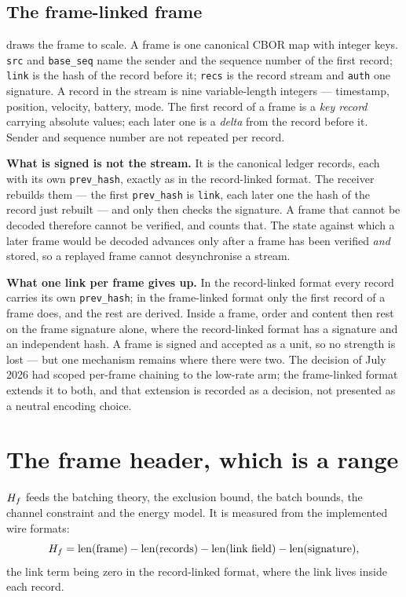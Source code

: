 \subsection{The frame-linked frame}



 draws the frame to scale. A frame is one canonical CBOR map with integer keys. \texttt{src} and \texttt{base\_seq} name the
sender and the sequence number of the first record; \texttt{link} is the hash of the record
before it; \texttt{recs} is the record stream and \texttt{auth} one signature. A record in the
stream is nine variable-length integers --- timestamp, position, velocity, battery, mode. The
first record of a frame is a \emph{key record} carrying absolute values; each later one is a
\emph{delta} from the record before it. Sender and sequence number are not repeated per record.

\textbf{What is signed is not the stream.} It is the canonical ledger records, each with its own
\texttt{prev\_hash}, exactly as in the record-linked format. The receiver rebuilds them --- the first
\texttt{prev\_hash} is \texttt{link}, each later one the hash of the record just rebuilt --- and
only then checks the signature. A frame that cannot be decoded therefore cannot be verified, and
 counts that. The state against which a later frame would be decoded advances
only after a frame has been verified \emph{and} stored, so a replayed frame cannot desynchronise
a stream.

\textbf{What one link per frame gives up.} In the record-linked format every record carries its own
\texttt{prev\_hash}; in the frame-linked format only the first record of a frame does, and the rest are
derived. Inside a frame, order and content then rest on the frame signature alone, where the record-linked
format has a signature and an independent hash. A frame is signed and accepted as a unit, so no
strength is lost --- but one mechanism remains where there were two. The decision of July 2026
had scoped per-frame chaining to the low-rate arm; the frame-linked format extends it to both, and that
extension is recorded as a decision, not presented as a neutral encoding choice.

\section{The frame header, which is a range}

$H_f$ feeds the batching theory, the exclusion bound, the batch bounds, the channel constraint and
the energy model. It is measured from the implemented wire formats:
\[
H_f = \operatorname{len}(\text{frame}) - \operatorname{len}(\text{records}) - \operatorname{len}(\text{link field}) - \operatorname{len}(\text{signature}),
\]
the link term being zero in the record-linked format, where the link lives inside each record.

